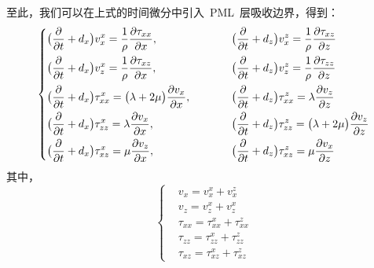\documentclass[UTF8]{ctexart}
\begin{document}
至此，我们可以在上式的时间微分中引入~PML~层吸收边界，得到：
\begin{equation}
\left\{ \begin{aligned}
& \big(\frac{\partial}{\partial t}+d_x\big)v_x^x=\frac{1}{\rho}\frac{\partial \tau_{xx}}{\partial x}, & \hspace{10mm} & \big(\frac{\partial}{\partial t}+d_z\big)v_x^z=\frac{1}{\rho}\frac{\partial \tau_{xz}}{\partial z} \\
& \big(\frac{\partial}{\partial t}+d_x\big)v_z^x=\frac{1}{\rho}\frac{\partial \tau_{xz}}{\partial x}, & \hspace{10mm} & \big(\frac{\partial}{\partial t}+d_z\big)v_z^z=\frac{1}{\rho}\frac{\partial \tau_{zz}}{\partial z} \\
& \big(\frac{\partial}{\partial t}+d_x\big)\tau_{xx}^x=\big(\lambda+2\mu\big)\frac{\partial v_x}{\partial x}, & \hspace{10mm} & \big(\frac{\partial}{\partial t}+d_z\big)\tau_{xx}^z=\lambda\frac{\partial v_z}{\partial z} \\
& \big(\frac{\partial}{\partial t}+d_x\big)\tau_{zz}^x=\lambda\frac{\partial v_x}{\partial x}, & \hspace{10mm} & \big(\frac{\partial}{\partial t}+d_z\big)\tau_{zz}^z=\big(\lambda+2\mu\big)\frac{\partial v_z}{\partial z} \\
& \big(\frac{\partial}{\partial t}+d_x\big)\tau_{xz}^x=\mu\frac{\partial v_z}{\partial x}, & \hspace{10mm} & \big(\frac{\partial}{\partial t}+d_z\big)\tau_{xz}^z=\mu\frac{\partial v_x}{\partial z}
\end{aligned} \right.
\end{equation}
其中，
\begin{equation}\label{eq:vt+}
\left\{ \begin{aligned}
& v_x=v_x^x+v_x^z \\
& v_z=v_z^x+v_z^x \\
& \tau_{xx}=\tau_{xx}^x+\tau_{xx}^z \\
& \tau_{zz}=\tau_{zz}^x+\tau_{zz}^z \\
& \tau_{xz}=\tau_{xz}^x+\tau_{xz}^z
\end{aligned} \right.
\end{equation}
\end{document}
